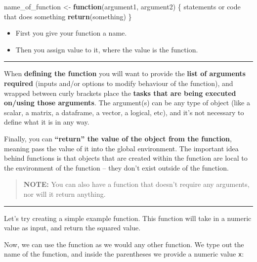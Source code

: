 \documentclass[
]{article}
\newenvironment{Shaded}{\begin{snugshade}}{\end{snugshade}}
\newcommand{\ControlFlowTok}[1]{\textcolor[rgb]{0.13,0.29,0.53}{\textbf{#1}}}
\newcommand{\KeywordTok}[1]{\textcolor[rgb]{0.13,0.29,0.53}{\textbf{#1}}}
\newcommand{\NormalTok}[1]{#1}
\newcommand{\StringTok}[1]{\textcolor[rgb]{0.31,0.60,0.02}{#1}}
\providecommand{\tightlist}{%
  \setlength{\itemsep}{0pt}\setlength{\parskip}{0pt}}
\begin{document}
\begin{Shaded}
\begin{Highlighting}[]
\NormalTok{name_of_function <-}\StringTok{ }\ControlFlowTok{function}\NormalTok{(argument1, argument2) \{}
\NormalTok{    statements or code that does something}
    \KeywordTok{return}\NormalTok{(something)}
\NormalTok{\}}
\end{Highlighting}
\end{Shaded}

\begin{itemize}
\tightlist
\item
  First you give your function a name.
\item
  Then you assign value to it, where the value is the function.
\end{itemize}

\begin{center}\rule{0.5\linewidth}{0.5pt}\end{center}

When \textbf{defining the function} you will want to provide the
\textbf{list of arguments required} (inputs and/or options to modify
behaviour of the function), and wrapped between curly brackets place the
\textbf{tasks that are being executed on/using those arguments}. The
argument(s) can be any type of object (like a scalar, a matrix, a
dataframe, a vector, a logical, etc), and it's not necessary to define
what it is in any way.

Finally, you can \textbf{``return'' the value of the object from the
function}, meaning pass the value of it into the global environment. The
important idea behind functions is that objects that are created within
the function are local to the environment of the function -- they don't
exist outside of the function.

\begin{quote}
\textbf{NOTE:} You can also have a function that doesn't require any
arguments, nor will it return anything.
\end{quote}

\begin{center}\rule{0.5\linewidth}{0.5pt}\end{center}

Let's try creating a simple example function. This function will take in
a numeric value as input, and return the squared value.

Now, we can use the function as we would any other function. We type out
the name of the function, and inside the parentheses we provide a
numeric value \texttt{x}:
\end{document}
